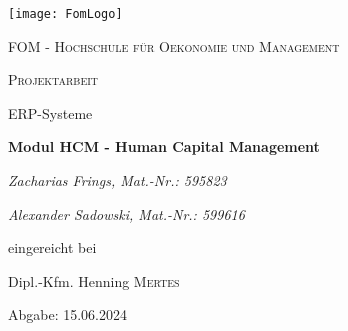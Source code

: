 \begin{titlepage}

	\centering
	\texttt{[image: FomLogo]}\par\vspace{1cm}
	{\scshape\LARGE FOM - Hochschule für Oekonomie und Management \par}
	\vspace{1cm}
	{\scshape\Large Projektarbeit\par ERP-Systeme\par}
	\vspace{1.5cm}
	{\huge\bfseries Modul HCM - Human Capital Management\par}
	\vspace{2cm}
	{\Large\itshape Zacharias Frings, Mat.-Nr.: 595823\par}
	{\Large\itshape Alexander Sadowski, Mat.-Nr.: 599616\par}
	\vfill
	eingereicht bei\par
	Dipl.-Kfm. Henning \textsc{Mertes}

	\vfill

	{\large Abgabe: 15.06.2024\par}
\end{titlepage}
